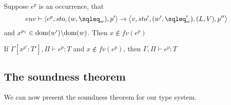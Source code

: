 \documentclass{eptcs}
\begin{document}



\begin{lemma}[History]\label{lemma:His}
	Suppose $e^p$ is an occurrence, that
	$$env\vdash\left\langle e^{p},sto,(w,\sqleq_w),p'\right\rangle\rightarrow\left\langle v,sto',(w',\sqleq_w'),(L,V),p''\right\rangle$$
		and $x^{p_1}\in \textrm{dom}(w')\backslash \textrm{dom}(w)$.
		Then $x\notin fv(e^{p})$
\end{lemma}



\begin{lemma}[Strengthening]\label{lemma:Strength}
	If $\Gamma[x^{p'}:T'],\Pi\vdash e^{p}:T$ and $x\notin fv(e^p)$, then $\Gamma,\Pi\vdash e^{p}:T$
\end{lemma}

\subsection{The soundness theorem}

We can now present the soundness theorem for our type system.
\end{document}

